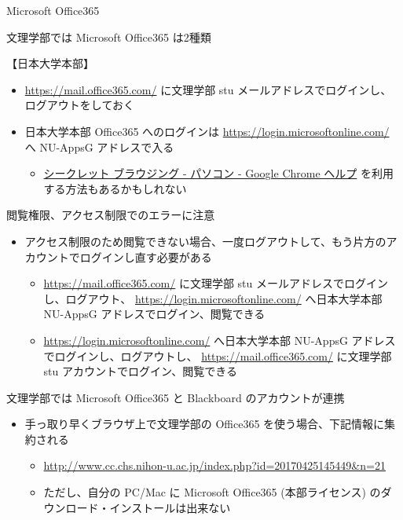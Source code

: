 \documentclass[a4j,10pt]{jsarticle}
\begin{document}
{\begin{frame}[label={sec:org712dbc5},fragile]{Microsoft Office365}
\begin{block}{文理学部では Microsoft Office365 は2種類}
\begin{block}{【日本大学本部】}
\begin{itemize}
\item \url{https://mail.office365.com/} に文理学部 stu メールアドレスでログインし、ログアウトをしておく
\item 日本大学本部 Office365 へのログインは \url{https://login.microsoftonline.com/} へ NU-AppsG アドレスで入る
\begin{itemize}
\item \href{https://support.google.com/chrome/answer/95464?co=GENIE.Platform\%3DDesktop\&hl=ja}{シークレット ブラウジング - パソコン - Google Chrome ヘルプ} を利用する方法もあるかもしれない
\end{itemize}
\end{itemize}
\end{block}
\par
\begin{block}{閲覧権限、アクセス制限でのエラーに注意}
\begin{itemize}
\item アクセス制限のため閲覧できない場合、一度ログアウトして、もう片方のアカウントでログインし直す必要がある
\begin{itemize}
\item \url{https://mail.office365.com/} に文理学部 stu メールアドレスでログインし、ログアウト、 \url{https://login.microsoftonline.com/} へ日本大学本部 NU-AppsG アドレスでログイン、閲覧できる
\item \url{https://login.microsoftonline.com/} へ日本大学本部 NU-AppsG アドレスでログインし、ログアウトし、  \url{https://mail.office365.com/} に文理学部 stu アカウントでログイン、閲覧できる
\end{itemize}
\end{itemize}
\end{block}
\end{block}
\par
\begin{block}{文理学部では Microsoft Office365 と Blackboard のアカウントが連携}
\begin{itemize}
\item 手っ取り早くブラウザ上で文理学部の Office365 を使う場合、下記情報に集約される
\begin{itemize}
\item \url{http://www.cc.chs.nihon-u.ac.jp/index.php?id=20170425145449\&n=21}
\item ただし、自分の PC/Mac に Microsoft Office365 (本部ライセンス) のダウンロード・インストールは出来ない
\end{itemize}
\end{itemize}
\par
\begin{verbatim}


\end{verbatim}
\end{block}
\end{frame}}
\end{document}
